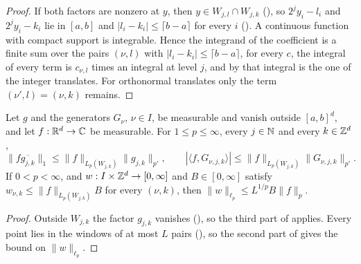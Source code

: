 \begin{proof}
\leanok
{}
If both factors are nonzero at $y$, then $y \in W_{j,l} \cap W_{j,k}$
(), so $2^j y_i - l_i$ and $2^j y_i - k_i$ lie in $[a, b]$ and
$|l_i - k_i| \leq \lceil b - a \rceil$ for every $i$ (). A
continuous function with compact support is integrable.
Hence the integrand of the coefficient is a finite sum over the pairs $(\nu, l)$ with
$|l_i - k_i| \leq \lceil b - a \rceil$, for every $c$, the integral of every term is $c_{\nu,l}$
times an integral at level $j$, and by  that integral is the
one of the integer translates. For orthonormal translates only the term $(\nu', l) = (\nu, k)$
remains.
\end{proof}

\begin{lemma}
\label{lem:daub-rd-coeff-local}
\leanok
{}
Let $g$ and the generators $G_\nu$, $\nu \in I$, be measurable and vanish outside $[a, b]^d$,
and let $f : \mathbb{R}^d \to \mathbb{C}$ be measurable. For $1 \leq p \leq \infty$, every $j \in \mathbb{N}$ and every
$k \in \mathbb{Z}^d$,
\[
  \|f \overline{g_{j,k}}\|_1 \leq \|f\|_{L_p(W_{j,k})} \|g_{j,k}\|_{p'} , \qquad
  |\langle f, G_{\nu,j,k} \rangle| \leq \|f\|_{L_p(W_{j,k})} \|G_{\nu,j,k}\|_{p'} .
\]
If $0 < p < \infty$, and $w : I \times \mathbb{Z}^d \to [0, \infty]$ and $B \in [0, \infty]$ satisfy
$w_{\nu,k} \leq \|f\|_{L_p(W_{j,k})} B$ for every $(\nu, k)$, then
$\|w\|_{\ell_p} \leq L^{1/p} B \|f\|_p$.
\end{lemma}

\begin{proof}
\leanok
{}
Outside $W_{j,k}$ the factor $g_{j,k}$ vanishes (), so the third part
of  applies. Every point lies in the windows of at most $L$
pairs (), so the second part of  gives
the bound on $\|w\|_{\ell_p}$.
\end{proof}

